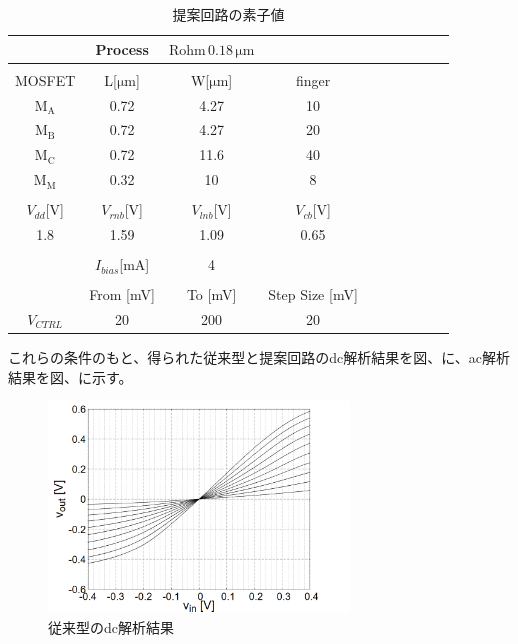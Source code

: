 \documentclass[twocolumn]{jsarticle}
\begin{document}
    \begin{table}[H]
        \caption{提案回路の素子値}
        \label{table:state_NtoN_ac}
        \centering
        \begin{tabular}{cccccccccc}
            \hline
            &Process&$\mathrm{Rohm\,0.18\,\mu m}$&\\
            \hline
            &&&\\
            MOSFET & L[$\mathrm{\mu m}$] & W[$\mathrm{\mu m}$] & finger\\
            \hline \hline
            $\mathrm{M_{A}}$ & 0.72 & 4.27 & 10 \\
            $\mathrm{M_{B}}$ & 0.72 & 4.27 & 20 \\
            $\mathrm{M_{C}}$ & 0.72 & 11.6 & 40 \\
            $\mathrm{M_{M}}$ & 0.32 & 10   & 8  \\
            &&&\\
            $V_{dd}$[V] & $V_{rnb}$[V] & $V_{lnb}$[V] & $V_{cb}$[V]\\
            \hline\hline
            1.8 & 1.59 & 1.09 & 0.65 \\
            &&&\\
            \hline\hline
            & $I_{bias}$[mA] & 4 & \\
            \hline\hline
            &&&\\
            & From [mV] & To [mV] &  Step Size [mV]   \\
            \hline\hline
            $V_{CTRL}$ & 20 & 200 & 20
        \end{tabular}
    \end{table}
    これらの条件のもと、得られた従来型と提案回路のdc解析結果を図、に、ac解析結果を図、に示す。
    \newpage
    \begin{figure}[h]
        \begin{center}
            \includegraphics*[width = 80mm]{figures/previous_dc_monochrome.PNG}
            \caption{従来型のdc解析結果}
            \label{fig:sim_previous_dc}
        \end{center}
    \end{figure}
\end{document}
